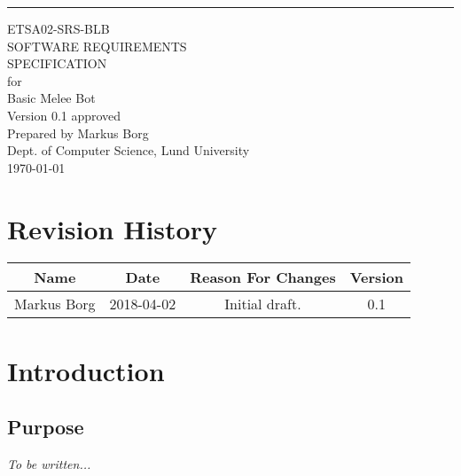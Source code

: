 \documentclass{scrreprt}
\date{}
\def\myversion{0.1 }
\begin{document}
\begin{flushright}
    \rule{16cm}{5pt}\vskip1cm
    \begin{bfseries}
    	\LARGE{ETSA02-SRS-BLB}\\
    	\vspace{1.5cm}
        \Huge{SOFTWARE REQUIREMENTS\\ SPECIFICATION}\\
        \vspace{0.5cm}
        for\\
        \vspace{0.5cm}
        Basic Melee Bot\\
        \vspace{1.5cm}
        \LARGE{Version \myversion approved}\\
        \vspace{1.5cm}
        Prepared by Markus Borg\\
        Dept. of Computer Science, Lund University\\
        \vspace{1.5cm}
        \today\\
    \end{bfseries}
\end{flushright}

\tableofcontents


\chapter*{Revision History}

\begin{center}
    \begin{tabular}{|c|c|c|c|}
        \hline
	    Name & Date & Reason For Changes & Version\\
        \hline
	    Markus Borg & 2018-04-02 & Initial draft. & 0.1\\
        \hline
    \end{tabular}
\end{center}

\chapter{Introduction}

\section{Purpose}
\textit{To be written...}\\
\end{document}
